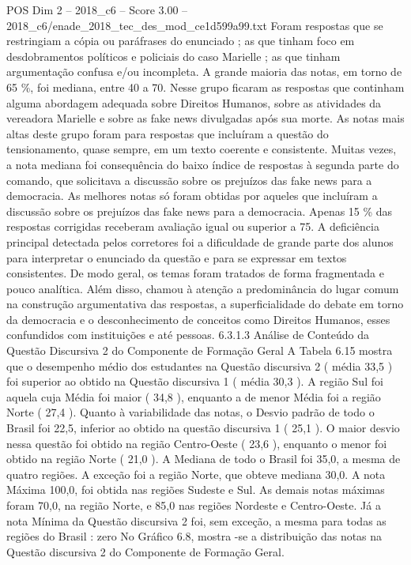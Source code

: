 \begin{textsample}{POS Dim 2 – 2018\_c6 – Score 3.00 – 2018\_c6/enade\_2018\_tec\_des\_mod\_ce1d599a99.txt}
Foram respostas que se restringiam a cópia ou paráfrases do enunciado ; as que tinham foco em desdobramentos políticos e policiais do caso Marielle ; as que tinham argumentação confusa e/ou incompleta.
A grande maioria das notas, em torno de 65 \%, foi mediana, entre 40 a 70.
Nesse grupo ficaram as respostas que continham alguma abordagem adequada sobre Direitos Humanos, sobre as atividades da vereadora Marielle e sobre as fake news divulgadas após sua morte.
As notas mais altas deste grupo foram para respostas que incluíram a questão do tensionamento, quase sempre, em um texto coerente e consistente.
Muitas vezes, a nota mediana foi consequência do baixo índice de respostas à segunda parte do comando, que solicitava a discussão sobre os prejuízos das fake news para a democracia.
As melhores notas só foram obtidas por aqueles que incluíram a discussão sobre os prejuízos das fake news para a democracia.
Apenas 15 \% das respostas corrigidas receberam avaliação igual ou superior a 75.
A deficiência principal detectada pelos corretores foi a dificuldade de grande parte dos alunos para interpretar o enunciado da questão e para se expressar em textos consistentes.
De modo geral, os temas foram tratados de forma fragmentada e pouco analítica.
Além disso, chamou à atenção a predominância do lugar comum na construção argumentativa das respostas, a superficialidade do debate em torno da democracia e o desconhecimento de conceitos como Direitos Humanos, esses confundidos com instituições e até pessoas. 6.3.1.3 Análise de Conteúdo da Questão Discursiva 2 do Componente de Formação Geral A Tabela 6.15 mostra que o desempenho médio dos estudantes na Questão discursiva 2 ( média 33,5 ) foi superior ao obtido na Questão discursiva 1 ( média 30,3 ).
A região Sul foi aquela cuja Média foi maior ( 34,8 ), enquanto a de menor Média foi a região Norte ( 27,4 ).
Quanto à variabilidade das notas, o Desvio padrão de todo o Brasil foi 22,5, inferior ao obtido na questão discursiva 1 ( 25,1 ).
O maior desvio nessa questão foi obtido na região Centro-Oeste ( 23,6 ), enquanto o menor foi obtido na região Norte ( 21,0 ).
A Mediana de todo o Brasil foi 35,0, a mesma de quatro regiões.
A exceção foi a região Norte, que obteve mediana 30,0.
A nota Máxima 100,0, foi obtida nas regiões Sudeste e Sul.
As demais notas máximas foram 70,0, na região Norte, e 85,0 nas regiões Nordeste e Centro-Oeste.
Já a nota Mínima da Questão discursiva 2 foi, sem exceção, a mesma para todas as regiões do Brasil : zero No Gráfico 6.8, mostra -se a distribuição das notas na Questão discursiva 2 do Componente de Formação Geral.

\end{textsample}
